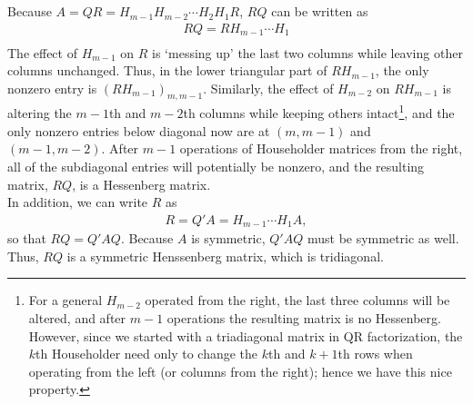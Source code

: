 \documentclass[11pt]{article}
\begin{document}
\subsection{}
Because $A = QR = H_{m-1}H_{m-2}\cdots H_2 H_1R$, $RQ$ can be written as 
\begin{equation}\begin{split} 
RQ = RH_{m-1}\cdots H_1 \\
\end{split}\nonumber\end{equation}
The effect of $H_{m-1}$ on $R$ is `messing up' the last two columns while leaving other columns unchanged. Thus, in the lower triangular part of $RH_{m-1}$, the only nonzero entry is $(RH_{m-1})_{m, m-1}$. Similarly, the effect of $H_{m-2}$ on $RH_{m-1}$ is altering the $m-1$th and $m-2$th columns while keeping others intact\footnote{For a general $H_{m-2}$ operated from the right, the last three columns will be altered, and after $m-1$ operations the resulting matrix is no Hessenberg. However, since we started with a triadiagonal matrix in QR factorization, the $k$th Householder need only to change the $k$th and $k+1$th rows when operating from the left (or columns from the right); hence we have this nice property.}, and the only nonzero entries below diagonal now are at $(m,m-1)$ and $(m-1,m-2)$. After $m-1$ operations of Householder matrices from the right, all of the subdiagonal entries will potentially be nonzero, and the resulting matrix, $RQ$, is a Hessenberg matrix.\\[0.3cm]
In addition, we can write $R$ as 
\begin{equation}\begin{split} 
R = Q'A = H_{m-1}\cdots H_1A,
\end{split}\nonumber\end{equation} 
so that $RQ=Q'AQ$. Because $A$ is symmetric, $Q'AQ$ must be symmetric as well. Thus, $RQ$ is a symmetric Henssenberg matrix, which is tridiagonal.
 
\end{document}

